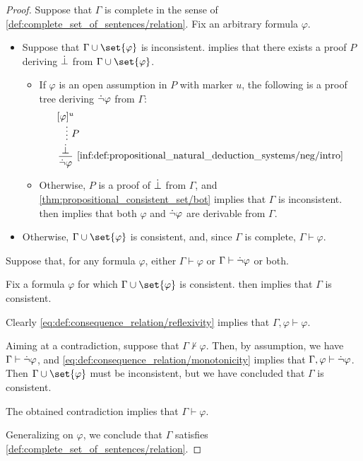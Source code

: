 \begin{proof}
  \SufficiencySubProof Suppose that \( \Gamma \) is complete in the sense of \cref{def:complete_set_of_sentences/relation}. Fix an arbitrary formula \( \varphi \).

  \begin{itemize}
    \item Suppose that \( \Gamma \cup \set{ \varphi } \) is inconsistent.  implies that there exists a proof \( P \) deriving \( \dot{\bot} \) from \( \Gamma \cup \set{ \varphi } \).

    \begin{itemize}
      \item If \( \varphi \) is an open assumption in \( P \) with marker \( u \), the following is a proof tree deriving \( \dot{\neg} \varphi \) from \( \Gamma \):
      \begin{equation*}
        \begin{prooftree}
          \hypo{ [\varphi]^u }
          \ellipsis { \( P \) } { \synbot }
          \infer1[\ref{inf:def:propositional_natural_deduction_systems/neg/intro}]{ \synneg \varphi }.
        \end{prooftree}
      \end{equation*}

      \item Otherwise, \( P \) is a proof of \( \dot{\bot} \) from \( \Gamma \), and \cref{thm:propositional_consistent_set/bot} implies that \( \Gamma \) is inconsistent.  then implies that both \( \varphi \) and \( \dot{\neg} \varphi \) are derivable from \( \Gamma \).
    \end{itemize}

    \item Otherwise, \( \Gamma \cup \set{ \varphi } \) is consistent, and, since \( \Gamma \) is complete, \( \Gamma \vdash \varphi \).
  \end{itemize}

  \NecessitySubProof Suppose that, for any formula \( \varphi \), either \( \Gamma \vdash \varphi \) or \( \Gamma \vdash \dot{\neg} \varphi \) or both.

  Fix a formula \( \varphi \) for which \( \Gamma \cup \set{ \varphi } \) is consistent.  then implies that \( \Gamma \) is consistent.

  Clearly \eqref{eq:def:consequence_relation/reflexivity} implies that \( \Gamma, \varphi \vdash \varphi \).

  Aiming at a contradiction, suppose that \( \Gamma \not\vdash \varphi \). Then, by assumption, we have \( \Gamma \vdash \dot{\neg} \varphi \), and \eqref{eq:def:consequence_relation/monotonicity} implies that \( \Gamma, \varphi \vdash \dot{\neg} \varphi \). Then \( \Gamma \cup \set{ \varphi } \) must be inconsistent, but we have concluded that \( \Gamma \) is consistent.

  The obtained contradiction implies that \( \Gamma \vdash \varphi \).

  Generalizing on \( \varphi \), we conclude that \( \Gamma \) satisfies \cref{def:complete_set_of_sentences/relation}.
\end{proof}

